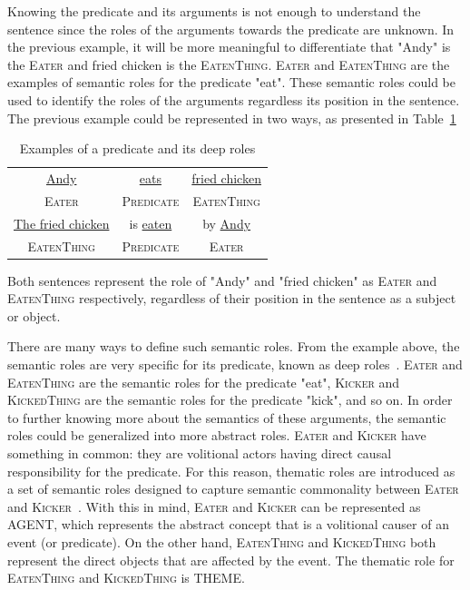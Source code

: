 Knowing the predicate and its arguments is not enough to understand the sentence since the roles of the arguments towards the predicate are unknown. In the previous example, it will be more meaningful to differentiate that "Andy" is the \textsc{Eater} and fried chicken is the \textsc{EatenThing}. \textsc{Eater} and \textsc{EatenThing} are the examples of semantic roles for the predicate "eat". These semantic roles could be used to identify the roles of the arguments regardless its position in the sentence. The previous example could be represented in two ways, as presented in Table~\ref{tab:examplesrl2}

\begin{table}
	\centering
	\caption{Examples of a predicate and its deep roles}
	\label{tab:examplesrl2}
	\begin{tabular}{|ccc|}
		\hline
		\underline{Andy} & \underline{eats} & \underline{fried chicken} \\
		\textsc{Eater} & \textsc{Predicate} & \textsc{EatenThing} \\
		\hline
		\underline{The fried chicken} & is \underline{eaten} & by \underline{Andy} \\
		\textsc{EatenThing} & \textsc{Predicate} & \textsc{Eater} \\
		\hline
	\end{tabular}
\end{table}

Both sentences represent the role of "Andy" and "fried chicken" as \textsc{Eater} and \textsc{EatenThing} respectively, regardless of their position in the sentence as a subject or object.

There are many ways to define such semantic roles. From the example above, the semantic roles are very specific for its predicate, known as deep roles~\citep{jurafsky2016speech}. \textsc{Eater} and \textsc{EatenThing} are the semantic roles for the predicate "eat", \textsc{Kicker} and \textsc{KickedThing} are the semantic roles for the predicate "kick", and so on. In order to further knowing more about the semantics of these arguments, the semantic roles could be generalized into more abstract roles. \textsc{Eater} and \textsc{Kicker} have something in common: they are volitional actors having direct causal responsibility for the predicate. For this reason, thematic roles are introduced as a set of semantic roles designed to capture semantic commonality between \textsc{Eater} and \textsc{Kicker}~\citep{jurafsky2016speech}. With this in mind, \textsc{Eater} and \textsc{Kicker} can be represented as AGENT, which represents the abstract concept that is a volitional causer of an event (or predicate). On the other hand, \textsc{EatenThing} and \textsc{KickedThing} both represent the direct objects that are affected by the event. The thematic role for \textsc{EatenThing} and \textsc{KickedThing} is THEME.


